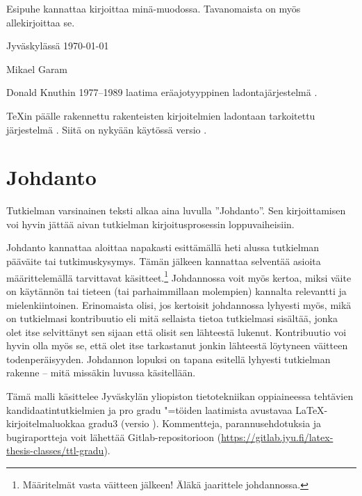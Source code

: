 \documentclass[utf8,bachelor]{gradu3}
\begin{document}
Esipuhe kannattaa kirjoittaa minä-muodossa. Tavanomaista on myös
allekirjoittaa se.

Jyväskylässä \today

\bigskip

Mikael Garam

\begin{thetermlist}
\item[\TeX] Donald Knuthin 1977--1989 laatima eräajotyyppinen
  ladontajärjestelmä \parencite[ks.][]{knuth86:_texbook}. 
\item[\LaTeX] \TeX in \parencite[ks.][]{knuth86:_texbook} päälle
  rakennettu rakenteisten kirjoitelmien ladontaan tarkoitettu
  järjestelmä \parencite[ks.][]{lamport94:_latex}.  Siitä on nykyään
  käytössä versio \LaTeXe.
\end{thetermlist}

\mainmatter

\chapter{Johdanto}

Tutkielman varsinainen teksti alkaa aina luvulla ''Johdanto''.  Sen
kirjoittamisen voi hyvin jättää aivan tutkielman kirjoitusprosessin
loppuvaiheisiin.

Johdanto kannattaa aloittaa napakasti esittämällä heti alussa
tutkielman pääväite tai tutkimuskysymys.  Tämän jälkeen kannattaa
selventää asioita määrittelemällä tarvittavat
käsitteet.\footnote{Määritelmät vasta väitteen jälkeen! Äläkä
  jaarittele johdannossa.}  Johdannossa voit myös kertoa, miksi väite
on käytännön tai tieteen (tai parhaimmillaan molempien) kannalta
relevantti ja mielenkiintoinen.  Erinomaista olisi, jos kertoisit
johdannossa lyhyesti myös, mikä on tutkielmasi kontribuutio eli mitä
sellaista tietoa tutkielmasi sisältää, jonka olet itse selvittänyt sen
sijaan että olisit sen lähteestä lukenut.  Kontribuutio voi hyvin olla
myös se, että olet itse tarkastanut jonkin lähteestä löytyneen
väitteen todenperäisyyden.  Johdannon lopuksi on tapana esitellä
lyhyesti tutkielman rakenne -- mitä missäkin luvussa käsitellään.

Tämä malli käsittelee Jyväskylän yliopiston tietotekniikan oppiaineessa
tehtävien kandidaatintutkielmien ja pro gradu "=töiden laatimista
avustavaa \LaTeX-kirjoitelmaluokkaa gradu3 (versio \graduclsversion).
Kommentteja, parannusehdotuksia ja bugiraportteja voit lähettää
Gitlab-repositorioon
(\url{https://gitlab.jyu.fi/latex-thesis-classes/ttl-gradu}).
\end{document}
